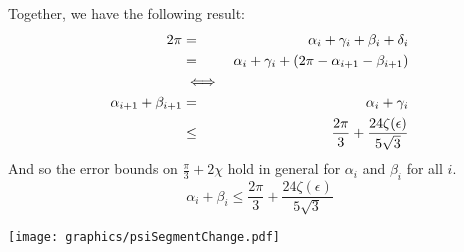 Together, we have the following result:
\begin{eqnarray*}
2\pi &=& \alpha_i + \gamma_i + \beta_i + \delta_i\\
 &=& \alpha_i + \gamma_i + \left( 2\pi - \alpha_{i+1} - \beta_{i+1} \right)\\
 &\iff&\\
\alpha_{i+1} + \beta_{i+1}&=&\alpha_i + \gamma_i \\
&\leq& \frac{2\pi}{3} + \frac{24\zeta(\epsilon)}{5\sqrt{3}}\\
\end{eqnarray*}
And so the error bounds on $\frac{\pi}{3}+2\chi$ hold in general for $\alpha_i$ and $\beta_i$ for all $i$.  
$$\alpha_i + \beta_i \leq \frac{2\pi}{3} + \frac{24\zeta(\epsilon)}{5\sqrt{3}}$$

\begin{minipage}{\linewidth}
\begin{center}
\texttt{[image: graphics/psiSegmentChange.pdf]}
\label{fig:psiSegmentChange.pdf}
\end{center}
\end{minipage}

